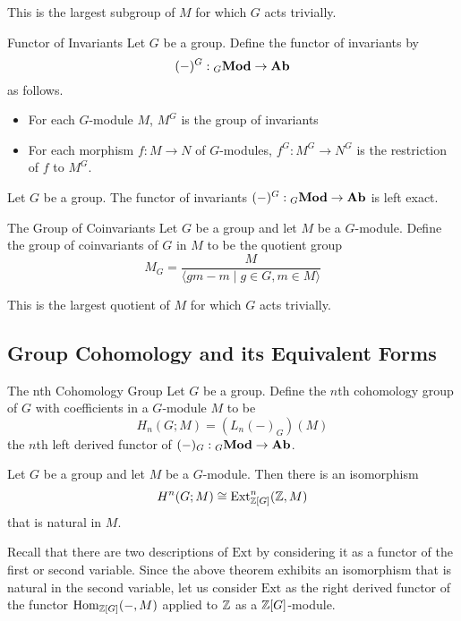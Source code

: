 \documentclass[a4paper]{article}
\begin{document}
This is the largest subgroup of $M$ for which $G$ acts trivially. 

\begin{defn}{Functor of Invariants}{} Let $G$ be a group. Define the functor of invariants by $$(-)^G:{_G}\bold{Mod}\to\bold{Ab}$$ as follows. 
\begin{itemize}
\item For each $G$-module $M$, $M^G$ is the group of invariants
\item For each morphism $f:M\to N$ of $G$-modules, $f^G:M^G\to N^G$ is the restriction of $f$ to $M^G$. 
\end{itemize}
\end{defn}

\begin{thm}{}{} Let $G$ be a group. The functor of invariants $(-)^G:{_G}\bold{Mod}\to\bold{Ab}$ is left exact. 
\end{thm}

\begin{defn}{The Group of Coinvariants}{} Let $G$ be a group and let $M$ be a $G$-module. Define the group of coinvariants of $G$ in $M$ to be the quotient group $$M_G=\frac{M}{\langle gm-m\;|\;g\in G, m\in M\rangle}$$
\end{defn}

This is the largest quotient of $M$ for which $G$ acts trivially. 

\subsection{Group Cohomology and its Equivalent Forms}
\begin{defn}{The nth Cohomology Group}{} Let $G$ be a group. Define the $n$th cohomology group of $G$ with coefficients in a $G$-module $M$ to be $$H_n(G;M)=(L_n(-)_G)(M)$$ the $n$th left derived functor of $(-)_G:{_G\bold{Mod}}\to\bold{Ab}$. 
\end{defn}

\begin{thm}{}{} Let $G$ be a group and let $M$ be a $G$-module. Then there is an isomorphism $$H^n(G;M)\cong\text{Ext}^n_{\mathbb{Z}[G]}(\mathbb{Z},M)$$ that is natural in $M$. 
\end{thm}

Recall that there are two descriptions of $\text{Ext}$ by considering it as a functor of the first or second variable. Since the above theorem exhibits an isomorphism that is natural in the second variable, let us consider $\text{Ext}$ as the right derived functor of the functor $\operatorname{Hom}_{\mathbb{Z}[G]}(-,M)$ applied to $\mathbb{Z}$ as a $\mathbb{Z}[G]$-module. 
\end{document}
